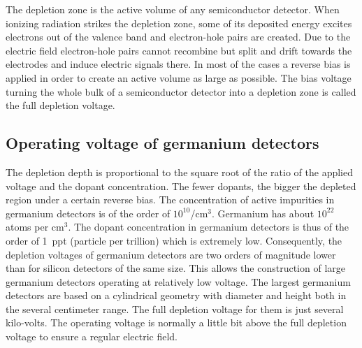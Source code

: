 The depletion zone is the active volume of any semiconductor
detector. When ionizing radiation strikes the depletion zone, some of
its deposited energy excites electrons out of the valence band and
electron-hole pairs are created. Due to the electric field
electron-hole pairs cannot recombine but split and drift towards the
electrodes and induce electric signals there. In most of the cases a
reverse bias is applied in order to create an active volume as large
as possible. The bias voltage turning the whole bulk of a
semiconductor detector into a depletion zone is called the full
depletion voltage.

\subsection{Operating voltage of germanium detectors}
\label{sec:det:volt}
The depletion depth is proportional to the square root of the ratio of
the applied voltage and the dopant concentration. The fewer dopants,
the bigger the depleted region under a certain reverse bias. The
concentration of active impurities in germanium detectors is of the
order of $10^{10}$/cm$^{3}$. Germanium has about $10^{22}$ atoms per
cm$^{3}$. The dopant concentration in germanium detectors is thus of
the order of 1~ppt (particle per trillion) which is extremely
low. Consequently, the depletion voltages of germanium detectors are
two orders of magnitude lower than for silicon detectors of the same
size. This allows the construction of large germanium detectors
operating at relatively low voltage. The largest germanium detectors
are based on a cylindrical geometry with diameter and height both in
the several centimeter range. The full depletion voltage for them is
just several kilo-volts. The operating voltage is normally a little
bit above the full depletion voltage to ensure a regular electric
field.


